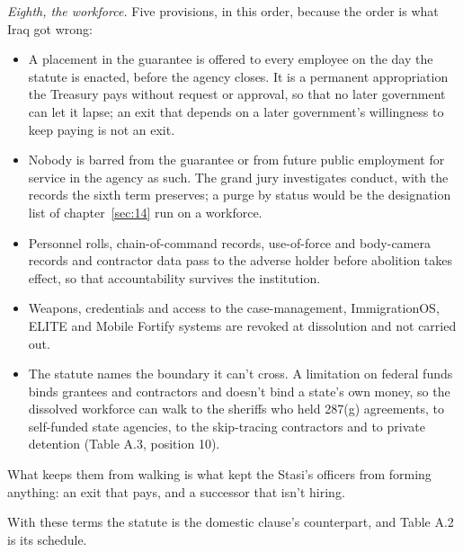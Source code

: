 \emph{Eighth, the workforce.} Five provisions, in this order, because the order is what Iraq got wrong:

\begin{itemize}
\item A placement in the guarantee is offered to every employee on the day the statute is enacted, before the agency closes. It is a permanent appropriation the Treasury pays without request or approval, so that no later government can let it lapse; an exit that depends on a later government's willingness to keep paying is not an exit.
\item Nobody is barred from the guarantee or from future public employment for service in the agency as such. The grand jury investigates conduct, with the records the sixth term preserves; a purge by status would be the designation list of chapter~\ref{sec:14} run on a workforce.
\item Personnel rolls, chain-of-command records, use-of-force and body-camera records and contractor data pass to the adverse holder before abolition takes effect, so that accountability survives the institution.
\item Weapons, credentials and access to the case-management, ImmigrationOS, ELITE and Mobile Fortify systems are revoked at dissolution and not carried out.
\item The statute names the boundary it can't cross. A limitation on federal funds binds grantees and contractors and doesn't bind a state's own money, so the dissolved workforce can walk to the sheriffs who held 287(g) agreements, to self-funded state agencies, to the skip-tracing contractors and to private detention (Table A.3, position 10).
\end{itemize}

What keeps them from walking is what kept the Stasi's officers from forming anything: an exit that pays, and a successor that isn't hiring.

With these terms the statute is the domestic clause's counterpart, and Table A.2 is its schedule.
